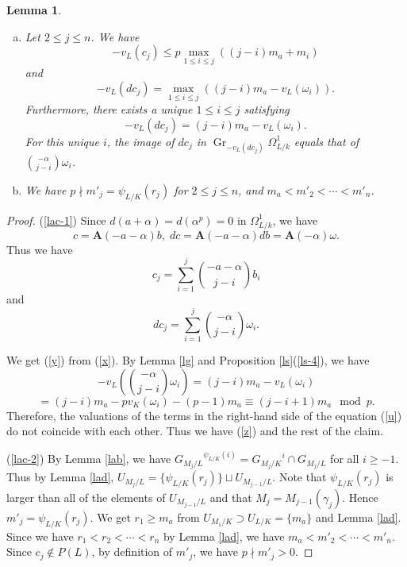 \documentclass[sn-mathphys-num]{sn-jnl}
\numberwithin{equation}{section}
\newcommand{\Gr}{\operatorname{Gr}}
\theoremstyle{plain}
\newtheorem{lemm}[theo]{Lemma}
\theoremstyle{definition}
\begin{document}
  \begin{lemm}\label{lac}
  \begin{enumerate}[(a)]
    \item\label{lac-1} Let $2\leq j\leq n$. We have
  \begin{equation}\label{y}
  -v_L(c_j)\leq p\max_{1\leq i\leq j}((j-i)m_a+m_i)
  \end{equation}
  and
  \begin{equation}\label{z}
  -v_L(dc_j)=\max_{1\leq i\leq j}((j-i)m_a-v_L(\omega_i)).
  \end{equation}
  Furthermore, there exists a unique $1\leq i\leq j$ satisfying
  \begin{equation}\label{za}
    -v_L(dc_j)=(j-i)m_a-v_L(\omega_i).
  \end{equation}
  For this unique $i$, the image of $dc_j$ in $\Gr_{-v_L(dc_j)}\Omega_{L/k}^1$ equals that of $\displaystyle{\binom{-\alpha}{j-i}\omega_i}$.
\item\label{lac-2} We have $p\nmid m'_j=\psi_{L/K}(r_j)$ for $2\leq j\leq n$, and $m_a<m'_2<\cdots<m'_n$.
  \end{enumerate}
\end{lemm}

\begin{proof}
  (\ref{lac-1}) Since
$d(a+\alpha)=d(\alpha^p)=0$ in $\Omega_{L/k}^1$, we have
\begin{equation}
c=\mathbf{A}(-a-\alpha)b,\;dc=\mathbf{A}(-a-\alpha)db=\mathbf{A}(-\alpha)\omega.
\end{equation}
Thus we have
\begin{equation}\label{x}
  c_j=\sum_{i=1}^j\binom{-a-\alpha}{j-i}b_i
\end{equation}
and
\begin{equation}\label{u}
dc_j=\sum_{i=1}^j\binom{-\alpha}{j-i}\omega_i.
\end{equation}

We get (\ref{y}) from (\ref{x}). By Lemma \ref{lg} and Proposition \ref{ls}(\ref{ls-4}), we have
\[
-v_L\left(\binom{-\alpha}{j-i}\omega_i\right)=(j-i)m_a-v_L(\omega_i)
\]
\begin{equation}
=(j-i)m_a-pv_K(\omega_i)-(p-1)m_a\equiv(j-i+1)m_a\mod p.
\end{equation}
Therefore, the valuations of the terms in the right-hand side of the equation (\ref{u}) do not coincide with each other. Thus we have (\ref{z}) and the rest of the claim.


(\ref{lac-2}) By Lemma \ref{lab}, we have ${G_{M_j/L}}^{\psi_{L/K}(i)}={G_{M_j/K}}^{i}\cap G_{M_j/L}$ for all $i\geq -1$. Thus by Lemma \ref{lad}, $U_{M_j/L}=\{\psi_{L/K}(r_j)\}\sqcup U_{M_{j-1}/L}$. Note that $\psi_{L/K}(r_j)$ is larger than all of the elements of $U_{M_{j-1}/L}$ and that $M_j=M_{j-1}(\gamma_j)$. Hence $m'_j=\psi_{L/K}(r_j)$. We get $r_1\geq m_a$ from $U_{M_1/K}\supset U_{L/K}=\{m_a\}$ and Lemma \ref{lad}. Since we have $r_1<r_2<\cdots<r_n$ by Lemma \ref{lad}, we have $m_a<m'_2<\cdots<m'_n$. Since $c_j\notin P(L)$, by definition of $m'_j$, we have $p\nmid m'_j>0$.
\end{proof}
\end{document}
